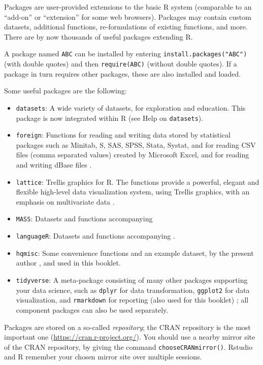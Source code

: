 \documentclass[]{book}
\begin{document}
Packages are user-provided extensions to the basic R
system (comparable to an ``add-on'' or ``extension'' for some web browsers).
Packages
may contain custom datasets, additional functions, re-formulations of
existing functions, and more. There are by now thousands of useful
packages extending R.

A package named \texttt{ABC} can be installed by
entering \texttt{install.packages("ABC")} (with double quotes) and then \texttt{require(ABC)} (without double quotes).
If a package in turn requires other packages, these are also installed
and loaded.

Some useful packages are the following:

\begin{itemize}
\item
  \texttt{datasets}: A wide
  variety of datasets, for exploration and education. This
  package is now integrated within R (see Help on \texttt{datasets}).
\item
  \texttt{foreign}: Functions for reading and writing data stored by statistical
  packages such as Minitab, S, SAS, SPSS, Stata, Systat, and for
  reading CSV files (comma separated values) created by Microsoft
  Excel, and for reading and writing dBase files \citep{R-foreign}.
\item
  \texttt{lattice}: Trellis graphics for R. The functions provide a
  powerful, elegant and flexible high-level data visualization system,
  using Trellis graphics, with an emphasis on multivariate data \citep{R-lattice}.
\item
  \texttt{MASS}: Datasets and functions accompanying \citep{VR02, R-MASS}
\item
  \texttt{languageR}: Datasets and functions accompanying \citep{baay08, R-languageR}.
\item
  \texttt{hqmisc}: Some convenience functions and an example dataset, by the present author \citep{R-hqmisc}, and used in this booklet.
\item
  \texttt{tidyverse}: A meta-package consisting of many other packages supporting your data science, such as \texttt{dplyr} for data transformation, \texttt{ggplot2} for data visualization, and \texttt{rmarkdown} for reporting (also used for this booklet) \citep{tidy19}; all component packages can also be used separately.
\end{itemize}

Packages are stored on a so-called \emph{repository}; the CRAN repository is
the most important one (\url{https://cran.r-project.org/}).
You should use a nearby mirror site of the CRAN
repository, by giving the command \texttt{chooseCRANmirror()}.
Rstudio and R remember your chosen mirror site over multiple sessions.
\end{document}
